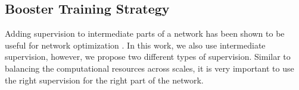 \documentclass[letterpaper, 10 pt, journal, twoside]{ieeetran}
\newcommand{\equref}[1]{~(\ref{#1})}
\begin{document}
\begin{table}[!t]
    \centering
    \renewcommand{\tabcolsep}{3.2mm}
    \caption{Impact of additional supervision.}
    \label{tab:loss}
    \vspace{-4mm}
\end{table}

\begin{table}[t]
    \centering
    \renewcommand{\tabcolsep}{3.8mm}
    \caption{Impact of  in \equref{equ:loss}.}
    \label{tab:ablation_lambda}
    \vspace{-5mm}
\end{table}

\subsection{Booster Training Strategy}\label{sec:super}
Adding supervision to intermediate parts of a network \cite{lee2015deeply} has been shown to be useful for network optimization \cite{zhao2017pyramid,zhang2018context,liu2019richer,liu2018semantic}. In this work, we also use intermediate supervision, however, we propose two different types of supervision. Similar to balancing the computational resources across scales, it is very important to use the right supervision for the right part of the network.        
\end{document}
